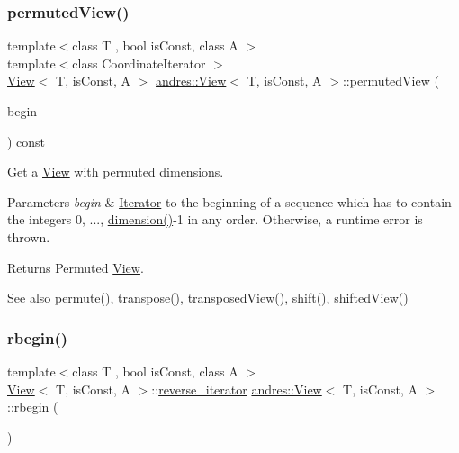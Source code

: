 \subsubsection{\texorpdfstring{permuted\+View()}{permutedView()}}
{\footnotesize\ttfamily template$<$class T , bool is\+Const, class A $>$ \\
template$<$class Coordinate\+Iterator $>$ \\
\hyperlink{classandres_1_1View}{View}$<$ T, is\+Const, A $>$ \hyperlink{classandres_1_1View}{andres\+::\+View}$<$ T, is\+Const, A $>$\+::permuted\+View (\begin{DoxyParamCaption}\item[{Coordinate\+Iterator}]{begin }\end{DoxyParamCaption}) const\hspace{0.3cm}{\ttfamily [inline]}}

Get a \hyperlink{classandres_1_1View}{View} with permuted dimensions.


\begin{DoxyParams}{Parameters}
{\em begin} & \hyperlink{classandres_1_1Iterator}{Iterator} to the beginning of a sequence which has to contain the integers 0, ..., \hyperlink{classandres_1_1View_a836c6755b62d6e619d043adcf8b91fab}{dimension()}-\/1 in any order. Otherwise, a runtime error is thrown. \\
\hline
\end{DoxyParams}
\begin{DoxyReturn}{Returns}
Permuted \hyperlink{classandres_1_1View}{View}. 
\end{DoxyReturn}
\begin{DoxySeeAlso}{See also}
\hyperlink{classandres_1_1View_a375d3e199e219568d8a6205e4088289b}{permute()}, \hyperlink{classandres_1_1View_ad7acad354a5be4086b9b21ab88b18d82}{transpose()}, \hyperlink{classandres_1_1View_a98a4c17bd2faa51788f6fd533a429e73}{transposed\+View()}, \hyperlink{classandres_1_1View_a476957393b3b21333bc665e852da47ad}{shift()}, \hyperlink{classandres_1_1View_abc938823dc964548f0f44ab10bca6b59}{shifted\+View()} 
\end{DoxySeeAlso}
\mbox{\label{classandres_1_1View_a035fa9d7c83683bfbfb9141251336ba5}} 
\subsubsection{\texorpdfstring{rbegin()}{rbegin()}\hspace{0.1cm}{\footnotesize\ttfamily [1/2]}}
{\footnotesize\ttfamily template$<$class T , bool is\+Const, class A $>$ \\
\hyperlink{classandres_1_1View}{View}$<$ T, is\+Const, A $>$\+::\hyperlink{classandres_1_1View_aab07af42756759420211d114bb705547}{reverse\+\_\+iterator} \hyperlink{classandres_1_1View}{andres\+::\+View}$<$ T, is\+Const, A $>$\+::rbegin (\begin{DoxyParamCaption}{ }\end{DoxyParamCaption})\hspace{0.3cm}{\ttfamily [inline]}}

